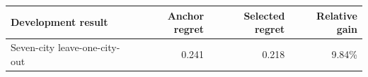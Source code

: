 \begin{tabular}{lrrr}
\toprule
Development result & Anchor regret & Selected regret & Relative gain \\
\midrule
Seven-city leave-one-city-out & 0.241 & 0.218 & 9.84\% \\
\bottomrule
\end{tabular}
